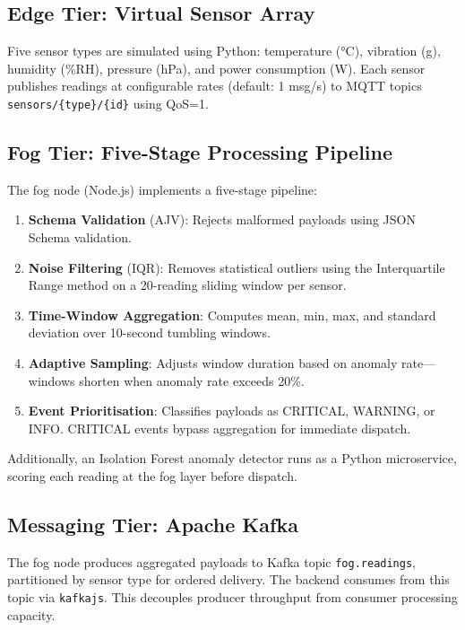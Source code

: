 \documentclass[conference]{IEEEtran}
\begin{document}
\subsection{Edge Tier: Virtual Sensor Array}

Five sensor types are simulated using Python: temperature (°C), vibration (g), humidity (\%RH), pressure (hPa), and power consumption (W). Each sensor publishes readings at configurable rates (default: 1 msg/s) to MQTT topics \texttt{sensors/\{type\}/\{id\}} using QoS=1.

\subsection{Fog Tier: Five-Stage Processing Pipeline}

The fog node (Node.js) implements a five-stage pipeline:

\begin{enumerate}
    \item \textbf{Schema Validation} (AJV): Rejects malformed payloads using JSON Schema validation.
    \item \textbf{Noise Filtering} (IQR): Removes statistical outliers using the Interquartile Range method on a 20-reading sliding window per sensor.
    \item \textbf{Time-Window Aggregation}: Computes mean, min, max, and standard deviation over 10-second tumbling windows.
    \item \textbf{Adaptive Sampling}: Adjusts window duration based on anomaly rate—windows shorten when anomaly rate exceeds 20\%.
    \item \textbf{Event Prioritisation}: Classifies payloads as CRITICAL, WARNING, or INFO. CRITICAL events bypass aggregation for immediate dispatch.
\end{enumerate}

Additionally, an Isolation Forest anomaly detector runs as a Python microservice, scoring each reading at the fog layer before dispatch.

\subsection{Messaging Tier: Apache Kafka}

The fog node produces aggregated payloads to Kafka topic \texttt{fog.readings}, partitioned by sensor type for ordered delivery. The backend consumes from this topic via \texttt{kafkajs}. This decouples producer throughput from consumer processing capacity.
\end{document}
